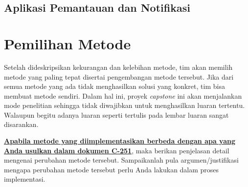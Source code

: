     \subsection{Aplikasi Pemantauan dan Notifikasi}
    \label{sec:Aplikasi_Notifikasi}

    \lipsum[1]

\section{Pemilihan Metode}
\label{sec:Pemilihan_Metode}
    
    Setelah dideskripsikan kekurangan dan kelebihan metode, tim akan memilih metode yang paling tepat disertai pengembangan metode tersebut. Jika dari semua metode yang ada tidak menghasilkan solusi yang konkret, tim bisa membuat metode sendiri. Dalam hal ini, proyek \textit{capstone} ini akan menjalankan mode penelitian sehingga tidak diwajibkan untuk menghasilkan luaran tertentu. Walaupun begitu adanya luaran seperti tertulis pada lembar luaran sangat disarankan. 
    
    \textbf{\uline{Apabila metode yang diimplementasikan berbeda dengan apa yang Anda usulkan dalam dokumen C-251}}, maka berikan penjelasan detail mengenai perubahan metode tersebut. Sampaikanlah pula argumen/justifikasi mengapa perubahan metode tersebut perlu Anda lakukan dalam proses implementasi.